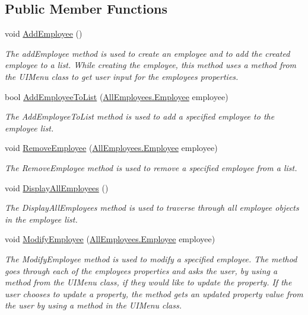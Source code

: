 \subsection*{Public Member Functions}
\begin{DoxyCompactItemize}
\item 
void \hyperlink{class_the_company_1_1_container_a5f7b06d8c706d98dd89d337c00c29d97}{Add\+Employee} ()
\begin{DoxyCompactList}\small\item\em The add\+Employee method is used to create an employee and to add the created employee to a list. While creating the employee, this method uses a method from the U\+I\+Menu class to get user input for the employee\textquotesingle{}s properties. \end{DoxyCompactList}\item 
bool \hyperlink{class_the_company_1_1_container_ad3b84fc48067495c959f9113c7512f81}{Add\+Employee\+To\+List} (\hyperlink{class_all_employees_1_1_employee}{All\+Employees.\+Employee} employee)
\begin{DoxyCompactList}\small\item\em The Add\+Employee\+To\+List method is used to add a specified employee to the employee list. \end{DoxyCompactList}\item 
void \hyperlink{class_the_company_1_1_container_a83e3bd47b7d2b1a89fc87e70f8fb9082}{Remove\+Employee} (\hyperlink{class_all_employees_1_1_employee}{All\+Employees.\+Employee} employee)
\begin{DoxyCompactList}\small\item\em The Remove\+Employee method is used to remove a specified employee from a list. \end{DoxyCompactList}\item 
void \hyperlink{class_the_company_1_1_container_a4ae3d96ffff3765f4b1f01314fbb4f45}{Display\+All\+Employees} ()
\begin{DoxyCompactList}\small\item\em The Display\+All\+Employees method is used to traverse through all employee objects in the employee list. \end{DoxyCompactList}\item 
void \hyperlink{class_the_company_1_1_container_abe4c2da087834fa62e80fe6457eba47d}{Modify\+Employee} (\hyperlink{class_all_employees_1_1_employee}{All\+Employees.\+Employee} employee)
\begin{DoxyCompactList}\small\item\em The Modify\+Employee method is used to modify a specified employee. The method goes through each of the employee\textquotesingle{}s properties and asks the user, by using a method from the U\+I\+Menu class, if they would like to update the property. If the user chooses to update a property, the method gets an updated property value from the user by using a method in the U\+I\+Menu class. \end{DoxyCompactList}\item 

\end{DoxyCompactItemize}
